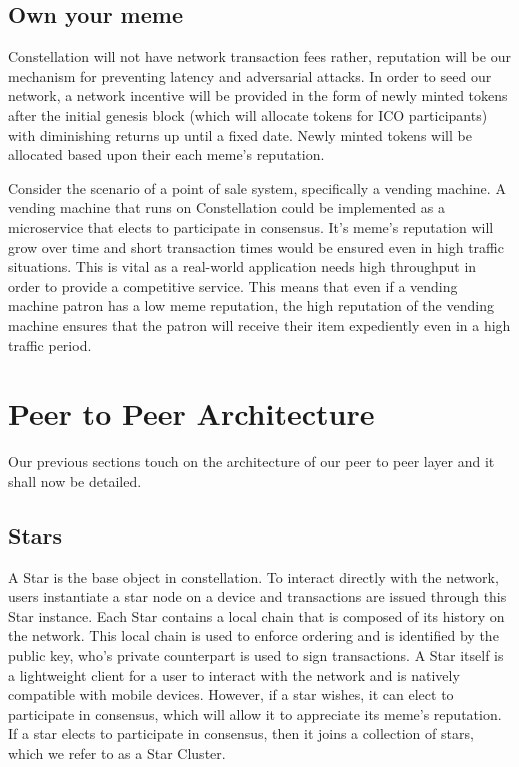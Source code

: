 \documentclass{article}
\begin{document}
 \subsection{Own your meme}
Constellation will not have network transaction fees rather, reputation will be our mechanism for preventing latency and adversarial attacks. In order to seed our network, a network incentive will be provided in the form of newly minted tokens after the initial genesis block (which will allocate tokens for ICO participants) with diminishing returns up until a fixed date. Newly minted tokens will be allocated based upon their each meme's reputation.

Consider the scenario of a point of sale system, specifically a vending machine. A vending machine that runs on Constellation could be implemented as a microservice that elects to participate in consensus. It's meme's reputation will grow over time and short transaction times would be ensured even in high traffic situations. This is vital as a real-world application needs high throughput in order to provide a competitive service. This means that even if a vending machine patron has a low meme reputation, the high reputation of the vending machine ensures that the patron will receive their item expediently even in a high traffic period. 

\section{Peer to Peer Architecture}
Our previous sections touch on the architecture of our peer to peer layer and it shall now be detailed. 

\subsection{Stars}
A Star is the base object in constellation. To interact directly with the network, users instantiate a star node on a device and transactions are issued through this Star instance. Each Star contains a local chain that is composed of its history on the network. This local chain is used to enforce ordering and is identified by the public key, who's private counterpart is used to sign transactions. A Star itself is a lightweight client for a user to interact with the network and is natively compatible with mobile devices. However, if a star wishes, it can elect to participate in consensus, which will allow it to appreciate its meme's reputation. If a star elects to participate in consensus, then it joins a collection of stars, which we refer to as a Star Cluster.
\end{document}
